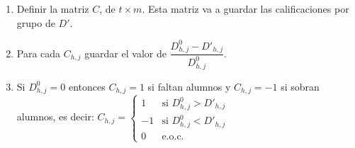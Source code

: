                                                                                                                                                                                                                                                                                                                                                                                                                                                                                     \begin{enumerate}
                                                                                                                                                                                                                                                                                                                                                                                                                                                                                  \item Definir la matriz $C$, de $t \times m$. Esta matriz va a guardar las calificaciones por grupo de $D'$.

\item Para cada $C_{h,j}$ guardar el valor de $\dfrac{D_{h,j}^{0} - D'_{h,j}}{D_{h,j}^{0}}$. 
                                                                                                                                                                                                                                                                                                                                                                                                                                                                                
                                                                                                                                                                                                                                                                                                                                                                                                                                                                                \item Si $D_{h,j}^{0} = 0$ entonces $C_{h,j} = 1$ si faltan alumnos y $C_{h,j} = -1$ si sobran alumnos, es decir: $C_{h,j} = \left \{ \begin{matrix} 1 & \mbox{si }D_{h,j}^{0} > D'_{h,j}\\ 
-1 & \mbox{si }D_{h,j}^{0} < D'_{h,j}\\ 0 & \mbox{e.o.c. }\end{matrix}\right.$
                                                                                                                                                                                                                                                                                                                                                                                                                                                                                    

\end{enumerate}

